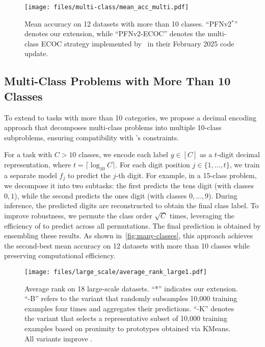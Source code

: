 \begin{figure}[t]
    \centering
    \texttt{[image: files/multi-class/mean\_acc\_multi.pdf]}
        \vspace{-8mm}
    \caption{Mean accuracy on 12 datasets with more than 10 classes. ``PFNv2$^*$'' denotes our extension, while ``PFNv2-ECOC'' denotes the multi-class ECOC strategy implemented by~\citet{hollmann2025TabPFNv2} in their February 2025 code update. 
    }
    \vspace{-2mm}
    \label{fig:many-classes}
\end{figure}
\subsection{Multi-Class Problems with More Than 10 Classes}
To extend \ours to tasks with more than 10 categories, we propose a decimal encoding approach that decomposes multi-class problems into multiple 10-class subproblems, ensuring compatibility with \ours's constraints.

For a task with $C > 10$ classes, we encode each label $y \in [C]$ as a $t$-digit decimal representation, where $t = \lceil \log_{10} C \rceil$. For each digit position $j \in \{1, \ldots, t\}$, we train a separate \ours model $f_j$ to predict the $j$-th digit.
For example, in a 15-class problem, we decompose it into two subtasks: the first predicts the tens digit (with classes ${0,1}$), while the second predicts the ones digit (with classes ${0, \dots, 9}$). During inference, the predicted digits are reconstructed to obtain the final class label. To improve robustness, we permute the class order $\sqrt{C}$ times, leveraging the efficiency of \ours to predict across all permutations. The final prediction is obtained by ensembling these results.
As shown in~\autoref{fig:many-classes}, this approach achieves the second-best mean accuracy on 12 datasets with more than 10 classes while preserving computational efficiency.

\begin{figure}
    \centering
    \texttt{[image: files/large\_scale/average\_rank\_large1.pdf]}
        \vspace{-8mm}
    \caption{Average rank on 18 large-scale datasets. ``*'' indicates our extension. ``-B'' refers to the variant that randomly subsamples 10,000 training examples four times and aggregates their predictions. ``-K'' denotes the variant that selects a representative subset of 10,000 training examples based on proximity to prototypes obtained via KMeans.
    All variants improve \ours.}
    \label{fig:large_scale}
\end{figure}

